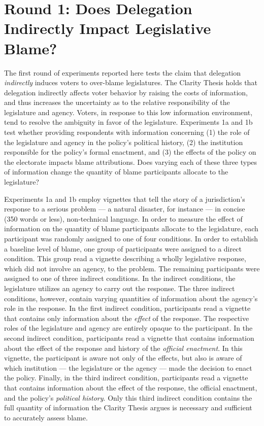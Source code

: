 \documentclass{article}
\begin{document}
\section{Round 1: Does Delegation Indirectly Impact Legislative Blame?}

The first round of experiments reported here tests the claim that delegation \emph{indirectly} induces voters to over-blame legislatures. The Clarity Thesis holds that delegation indirectly affects voter behavior by raising the costs of information, and thus increases the uncertainty as to the relative responsibility of the legislature and agency. Voters, in response to this low information environment, tend to resolve the ambiguity in favor of the legislature. Experiments 1a and 1b test whether providing respondents with information concerning (1) the role of the legislature and agency in the policy's political history, (2) the institution responsible for the policy's formal enactment, and (3) the effects of the policy on the electorate impacts blame attributions. Does varying each of these three types of information change the quantity of blame participants allocate to the legislature?  

Experiments 1a and 1b employ vignettes that tell the story of a jurisdiction's response to a serious problem --- a natural disaster, for instance --- in concise (350 words or less), non-technical language. In order to measure the effect of information on the quantity of blame participants allocate to the legislature, each participant was randomly assigned to one of four conditions. In order to establish a baseline level of blame, one group of participants were assigned to a direct condition. This group read a vignette describing a wholly legislative response, which did not involve an agency, to the problem. The remaining participants were assigned to one of three indirect conditions. In the indirect conditions, the legislature utilizes an agency to carry out the response. The three indirect conditions, however, contain varying quantities of information about the agency's role in the response. In the first indirect condition, participants read a vignette that contains only information about the \emph{effect} of the response. The respective roles of the legislature and agency are entirely opaque to the participant. In the second indirect condition, participants read a vignette that contains information about the effect of the response and history of the \emph{official enactment}. In this vignette, the participant is aware not only of the effects, but also is aware of which institution --- the legislature or the agency --- made the decision to enact the policy. Finally, in the third indirect condition, participants read a vignette that contains information about the effect of the response, the official enactment, and the policy's \emph{political history}. Only this third indirect condition contains the full quantity of information the Clarity Thesis argues is necessary and sufficient to accurately assess blame. 
\end{document}

